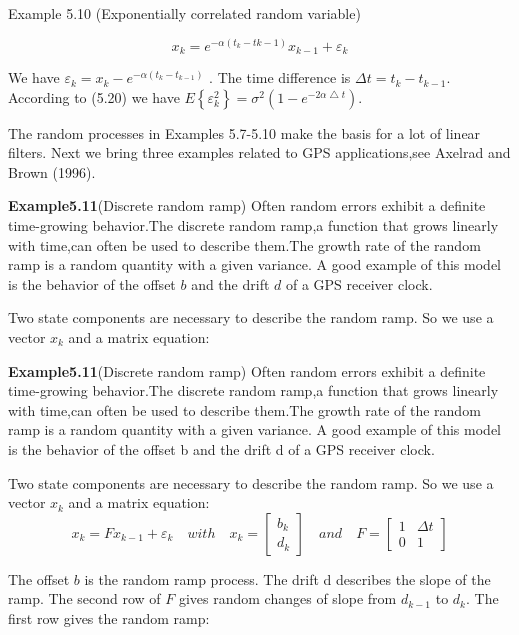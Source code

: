 	Example 5.10 (Exponentially correlated random variable)
	
	\[ x_{k}=e^{-\alpha(t_{k}-t{k-1})}x_{k-1}+\varepsilon_{k}\]
	
	We have $ \varepsilon_{k}=x_{k}-e^{-\alpha(t_{k}-t_{k-1})} $ . The time difference is $ \Delta t=t_{k}-t_{k-1} $. According to (5.20) we have $ E\left\lbrace \varepsilon_{k}^{2}\right\rbrace =\sigma^{2}(1-e^{-2 \alpha   \bigtriangleup t  })  $.
	
	The random processes in Examples 5.7-5.10 make the basis for a lot of linear filters. Next we bring three examples related to GPS applications,see Axelrad and Brown (1996).  
	
	\textbf{Example5.11}(Discrete random ramp) Often random errors exhibit a definite time-growing behavior.The discrete random ramp,a function that grows linearly with time,can often be used to describe them.The growth rate of the random ramp is a random quantity with a given variance. A good example of this model is the behavior of the offset $ b $ and the drift $ d $ of a GPS receiver clock. 	
	
	 Two state components are necessary to describe the random ramp. So we use a vector $ x_{k} $ and a matrix equation:
	 
		
	\textbf{Example5.11}(Discrete random ramp) Often random errors exhibit a definite time-growing behavior.The discrete random ramp,a function that grows linearly with time,can often be used to describe them.The growth rate of the random ramp is a random quantity with a given variance. A good example of this model is the behavior of the offset b and the drift d of a GPS receiver clock. 
	
	Two state components are necessary to describe the random ramp. So we use a vector $ x_{k} $ and a matrix equation:
	\begin{equation}\label{5.27}
	  x_{k}=Fx_{k-1}+\varepsilon _{k} \quad with \quad  x_{k}= \begin{bmatrix} b_{k}  \\ d_{k}\end{bmatrix} \quad and\quad F=\begin{bmatrix} 1&\Delta t  \\ 0 & 1 \end{bmatrix}
	\end{equation}
 
		
    The offset $b$ is the random ramp process. The drift d describes the slope of the ramp. The second row of $ F $ gives random changes of slope from $ d_{k-1} $ to $ d_{k} $. The first row gives the random ramp:
    

